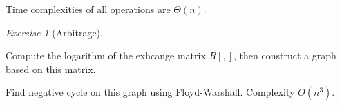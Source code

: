\documentclass[a4paper,10pt,twoside]{article}
\theoremstyle{plain}
\theoremstyle{definition}
\theoremstyle{remark}
\newtheorem{exercise}{Exercise}
\begin{document}
Time complexities of all operations are $\Theta(n)$.

\begin{exercise}[Arbitrage]\

Compute the logarithm of the exhcange matrix $R[,]$, then construct
a graph based on this matrix.

Find negative cycle on this graph using Floyd-Warshall. Complexity $O(n^3)$.
	
\end{exercise}	
\end{document}
